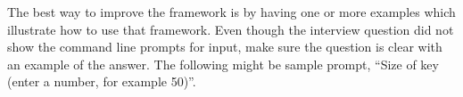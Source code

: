 
\begin{answer}{6}
The best way to improve the framework is by having one or more examples which illustrate how to use that framework. Even though the interview question did not show the command line prompts for input, make sure the question is clear with an example of the answer. The following might be sample prompt,
“Size of key (enter a number, for example 50)”.
\end{answer}

